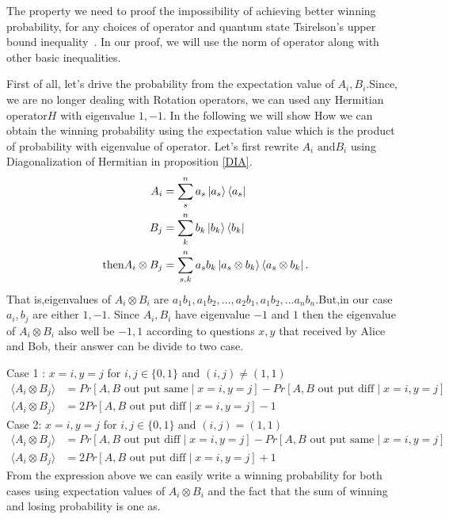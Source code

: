 The property we need to proof the impossibility of achieving better  winning probability, for any choices of operator and quantum state Tsirelson’s  upper bound inequality~\citep*{Cirel'son1980}.
In our proof, we will use the norm of operator along with other basic inequalities.


First of all, let's drive the probability from the expectation value of $A_i,B_i$.Since, we are no longer dealing with Rotation operators, we can used any Hermitian  operator$H$ with eigenvalue $1,-1$. In the following we will show How we can obtain the winning probability using the expectation value which is the product  of probability with  eigenvalue of operator.
Let's first rewrite $A_i\text{ and} B_i$ using  Diagonalization of Hermitian in proposition \ref{DIA}.
\begin{align}\label{NEED}
A_i&=\sum_s^n a_s \ket{a_s}\bra{a_s}\nonumber\\
B_j&=\sum_k^n  b_k \ket{b_k}\bra{b_k}\nonumber\\
\text{then} A_i\otimes B_j&=\sum_{s,k}^n  a_s b_k \ket{a_s\otimes b_k}\bra{a_s \otimes b_k}.
\end{align}
That is,eigenvalues of $A_i\otimes B_i$ are $a_1 b_1 ,a_1b_2,\dots,a_2 b_1,a_1 b_2,\ldots a_n b_n$.But,in our case $a_i,b_j$ are either $1,-1$. Since $A_i, B_i$  have eigenvalue $-1$ and $1$ then the eigenvalue of $A_i\otimes B_i$ also well be $-1,1$ according to  questions $x,y$  that received by Alice and Bob, their answer can be divide to two case.

Case 1 :
$x=i,y=j$ for $i,j\in \{0,1\}$ and $(i,j)\neq (1,1)$
\begin{align}
\langle A_i\otimes B_j \rangle&=Pr[A,B \text{ out put same} \mid  x=i,y=j]-Pr[A,B \text{ out put diff}  \mid  x=i,y=j]\\
\langle A_i\otimes B_j\rangle &=2Pr[A,B \text{ out put diff} \mid  x=i,y=j]-1
\end{align}
Case 2:
$x=i,y=j$ for $i,j\in \{0,1\}$ and $(i,j)= (1,1)$
\begin{align}
\langle A_i\otimes B_j\rangle &=Pr[A,B \text{ out put diff} \mid  x=i,y=j]-Pr[A,B \text{ out put same}  \mid  x=i,y=j]\\
\langle A_i\otimes B_j\rangle&=2Pr[A,B \text{ out put diff} \mid  x=i,y=j]+1
\end{align}
From the expression above we can easily write a winning probability for both cases using expectation values of $A_i\otimes B_i$ and the fact that the sum of winning and losing probability  is one as.

